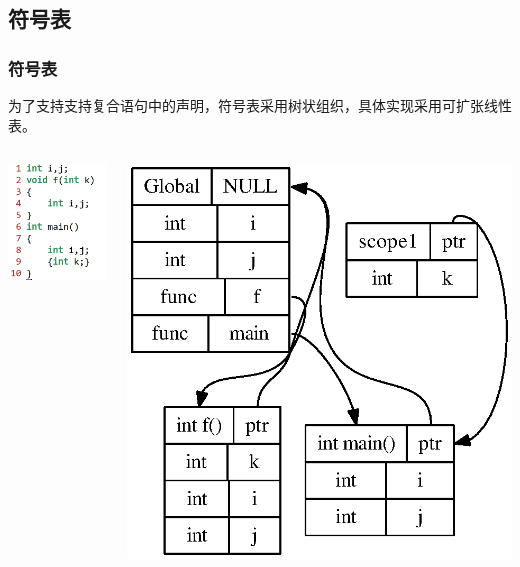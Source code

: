 \documentclass{beamer}
\begin{document}
\subsection{符号表}
\begin{frame}
\frametitle{符号表}
\noindent
为了支持支持复合语句中的声明，符号表采用树状组织，具体实现采用可扩张线性表。
\begin{columns}
	\begin{center}
	\includegraphics[scale=0.45]{symtbl_example.png}
	\end{center}
	\begin{center}
	\includegraphics[scale=0.4]{symtbl.eps}
	\end{center}
\end{columns}
\end{frame}
\end{document}
